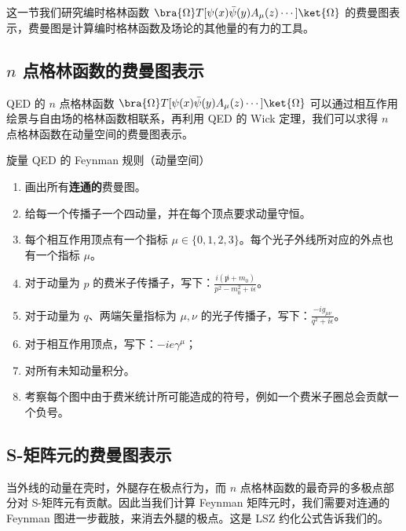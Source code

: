 
这一节我们研究编时格林函数 $\bra{\Omega} T[\psi(x)\bar\psi(y)A_\mu(z) \cdots ]\ket{\Omega}$ 的费曼图表示，费曼图是计算编时格林函数及场论的其他量的有力的工具。
\subsection{$n$ 点格林函数的费曼图表示}
QED 的 $n$ 点格林函数 $\bra{\Omega} T[\psi(x)\bar\psi(y)A_\mu(z) \cdots] \ket{\Omega}$ 可以通过相互作用绘景与自由场的格林函数相联系，再利用 QED 的 Wick 定理，我们可以求得 $n$ 点格林函数在动量空间的费曼图表示。
\begin{theorem}{旋量 QED 的 Feynman 规则（动量空间）}\label{the_qedfey_1}

\begin{enumerate}
\item 画出所有\textbf{连通的}费曼图。
\item 给每一个传播子一个四动量，并在每个顶点要求动量守恒。
\item 每个相互作用顶点有一个指标 $\mu\in\{0,1,2,3\}$。每个光子外线所对应的外点也有一个指标 $\mu$。
\item 对于动量为 $p$ 的费米子传播子，写下：$\frac{i(\not p+m_0)}{p^2-m_0^2 + i\epsilon}$。
\item 对于动量为 $q$、两端矢量指标为 $\mu,\nu$ 的光子传播子，写下：$\frac{-ig_{\mu\nu}}{q^2 + i\epsilon}$。
\item 对于相互作用顶点，写下：$-ie\gamma^\mu$；
\item 
对所有未知动量积分。
\item 
考察每个图中由于费米统计所可能造成的符号，例如一个费米子圈总会贡献一个负号。
\end{enumerate}
\end{theorem}

\subsection{S-矩阵元的费曼图表示}

当外线的动量在壳时，外腿存在极点行为，而 $n$ 点格林函数的最奇异的多极点部分对 S-矩阵元有贡献。因此当我们计算 Feynman 矩阵元时，我们需要对连通的 Feynman 图进一步截肢，来消去外腿的极点。这是 LSZ 约化公式告诉我们的。

